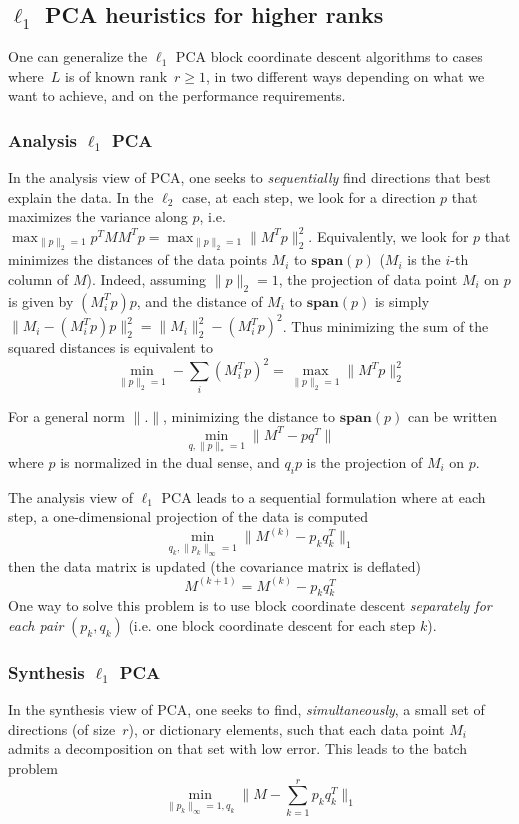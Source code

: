 \newpage
\subsection{$\ell_{1}$ PCA heuristics for higher ranks}
One can generalize the $\ell_1$ PCA block coordinate descent algorithms to cases where~$L$ is of known rank~$r \geq 1$, in two different ways depending on what we want to achieve, and on the performance requirements.

\subsubsection{Analysis $\ell_1$ PCA}
In the analysis view of PCA, one seeks to \emph{sequentially} find directions that best explain the data. In the $\ell_2$ case, at each step, we look for a direction $p$ that maximizes the variance along $p$, i.e. $\max_{\|p\|_2 =1} p^TMM^Tp = \max_{\|p\|_2 =1} \|M^Tp\|_2^2$. Equivalently, we look for $p$ that minimizes the distances of the data points $M_i$ to $\mathbf{span}(p)$ ($M_i$ is the $i$-th column of $M$). Indeed, assuming $\|p\|_2 =1$, the projection of data point $M_i$ on $p$ is given by $(M_i^Tp) p$, and the distance of $M_i$ to $\mathbf{span}(p)$ is simply $\|M_i - (M_i^Tp) p\|_2^2 = \|M_i\|_2^2 - (M_i^Tp)^2$. Thus minimizing the sum of the squared distances is equivalent to
\[
\min_{\|p\|_2 = 1} - \sum_i (M_i^Tp)^2 = \max_{\|p\|_2 = 1} \|M^Tp\|_2^2
\]

For a general norm $\|.\|$, minimizing the distance to $\mathbf{span}(p)$ can be written
\[
\min_{q, \|p\|_* = 1} \|M^T - p q^T\|
\]
where $p$ is normalized in the dual sense, and $q_i p$ is the projection of $M_i$ on $p$.

The analysis view of $\ell_1$ PCA leads to a sequential formulation where at each step, a one-dimensional projection of the data is computed
\[
\min_{q_k, \|p_k\|_\infty = 1} \|M^{(k)} - p_kq_k^T\|_1
\]
then the data matrix is updated (the covariance matrix is deflated)
\[
M^{(k+1)} = M^{(k)} - p_kq_k^T
\]
One way to solve this problem is to use block coordinate descent \emph{separately for each pair} $(p_k, q_k)$ (i.e. one block coordinate descent for each step $k$).

\subsubsection{Synthesis $\ell_1$ PCA}
In the synthesis view of PCA, one seeks to find, \emph{simultaneously}, a small set of directions (of size~$r$), or dictionary elements, such that each data point $M_i$ admits a decomposition on that set with low error. This leads to the batch problem
\[
\min_{\|p_k\|_\infty = 1, q_k} \| M - \sum_{k=1}^{r} p_k q_k^T \|_1
\]

